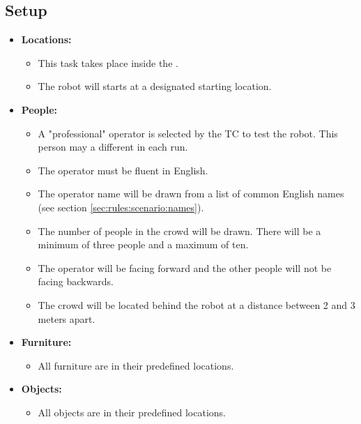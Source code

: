 \subsection*{Setup}
\begin{itemize}[nosep]	
	\item \textbf{Locations:} 
	\begin{itemize}
		\item This task takes place inside the \Arena{}.
		\item The robot will starts at a designated starting location. 
	\end{itemize}
	\item \textbf{People:} 
	\begin{itemize}
		\item A "professional" operator is selected by the TC to test the robot. This person may a different in each run. 
		\item The operator must be fluent in English. 
		\item The operator name will be drawn from a list of common English names (see section \ref{sec:rules:scenario:names}).
		\item The number of people in the crowd will be drawn. There will be a minimum of three people and a maximum of ten.
		\item The operator will be facing forward and the other people will not be facing backwards.
		\item The crowd will be located behind the robot at a distance between 2 and 3 meters apart.
	\end{itemize}
	\item \textbf{Furniture:} 
	\begin{itemize}
		\item All furniture are in their predefined locations.
	\end{itemize}
    \item \textbf{Objects:} 
    \begin{itemize}
		\item All objects are in their predefined locations.
	\end{itemize}
\end{itemize}

